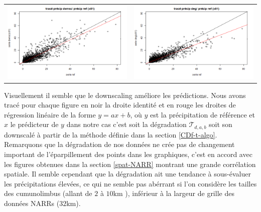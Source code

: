 \documentclass[a4paper,10pt]{article}
\begin{document}
\begin{tabular}{cc}
	\includegraphics[scale=0.4]{images/pr_4_ds.png} & \includegraphics[scale=0.4]{images/pr_4_dg.png}  \\
\end{tabular} 


Visuellement il semble que le downscaling améliore les prédictions. Nous avons tracé pour chaque figure en noir la droite identité et en rouge les droites de régression linéaire de la forme $y=ax+b$, où $y$ est la précipitation de référence et $x$ le prédicteur de $y$ dans notre cas c'est soit la dégradation $\mathcal{T}_{d,a,b}$ soit son downscalé à partir de la méthode définie dans la section \ref{CDf-t-algo}. Remarquons que la dégradation de nos données ne crée pas de changement important de l'éparpillement des points dans les graphiques, c'est en accord avec les figures obtenues dans la section \ref{spat-NARR} montrant une grande corrélation spatiale. Il semble cependant que la dégradation ait une tendance à sous-évaluer les précipitations élevées, ce qui ne semble pas abérrant si l'on considère les tailles des cumunolimbus (allant de $2$ à $10$km ), inférieur à la largeur de grille des données NARRs ($32$km). 
\end{document}

